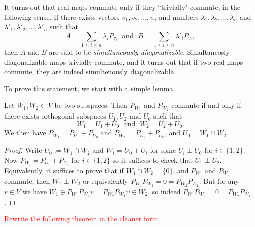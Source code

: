 It turns out that real maps commute only if they ``trivially" commute, in the following sense. If there exists vectors $v_{1}, v_{2}, \ldots, v_{n}$ and numbers $\lambda_{1}, \lambda_{2}, \ldots, \lambda_{n}$ and $\lambda'_{1}, \lambda'_{2}, \ldots, \lambda'_{n}$ such that
\[
	A = \sum_{1 \leq i \leq n} \lambda_{i} P_{v_{i}} \; \text{ and } \; B = \sum_{1 \leq i \leq n} \lambda'_{i} P_{v_{i}},
\]
then $A$ and $B$ are said to be \textit{simultaneously diagonalizable}. Simultaneosly diagonalizable maps trivially commute, and it turns out that if two real maps commute, they are indeed simultenously diagonalizable.

To prove this statement, we start with a simple lemma.

\begin{lem}\label{projectionLemma}
	Let $W_{1}, W_{2} \subset V$ be two subspaces. Then $P_{W_{1}}$ and $P_{W_{2}}$ commute if and only if there exists orthogonal subspaces $U_{1}, U_{2}$ and $U_{0}$ such that
	\[
		W_{1} = U_{1} + U_{0}  \; \text{ and } \; W_{2} = U_{2} + U_{0}.
	\]
	We then have $P_{W_{1}} = P_{U_{1}} + P_{U_{0}}$ and $P_{W_{2}} = P_{U_{2}} + P_{U_{0}}$, and $U_{0} = W_{1} \cap W_{2}$.
\end{lem}
\begin{proof}
	Write $U_{0} := W_{1} \cap W_{2}$ and $W_{i} = U_{0} + U_{i}$ for some $U_{i} \perp U_{0}$ for $i \in \{1, 2\}$. Now $P_{W_{i}} = P_{U_{i}} + P_{U_{0}}$ for $i \in \{1, 2\}$ so it suffices to check that $U_{1} \perp U_{2}$. Equivalently, it suffices to prove that if $W_{1} \cap W_{2} = \{0\}$, and $P_{W_{1}}$ and $P_{W_{2}}$ commute, then $W_{1} \perp W_{2}$ or equivalently $P_{W_{1}}P_{W_{2}} = 0 = P_{W_{2}}P_{W_{1}}$. But for any $v \in V$ we have $W_{1} \ni P_{W_{1}}P_{W_{2}}v = P_{W_{2}}P_{W_{1}}v \in W_{2}$, so indeed $P_{W_{1}}P_{W_{2}} = 0 = P_{W_{2}}P_{W_{1}}$.
\end{proof}

\textcolor{red}{Rewrite the following theorem in the cleaner form}

